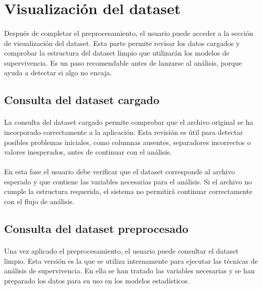 \section{Visualización del dataset}

\paragraph*{}Después de completar el preprocesamiento, el usuario puede acceder a la sección de visualización del dataset. Esta parte permite revisar los datos cargados y comprobar la estructura del dataset limpio que utilizarán los modelos de supervivencia. Es un paso recomendable antes de lanzarse al análisis, porque ayuda a detectar si algo no encaja.

\subsection{Consulta del dataset cargado}

\paragraph*{}La consulta del dataset cargado permite comprobar que el archivo original se ha incorporado correctamente a la aplicación. Esta revisión es útil para detectar posibles problemas iniciales, como columnas ausentes, separadores incorrectos o valores inesperados, antes de continuar con el análisis.

\paragraph*{}En esta fase el usuario debe verificar que el dataset corresponde al archivo esperado y que contiene las variables necesarias para el análisis. Si el archivo no cumple la estructura requerida, el sistema no permitirá continuar correctamente con el flujo de análisis.

\subsection{Consulta del dataset preprocesado}

\paragraph*{}Una vez aplicado el preprocesamiento, el usuario puede consultar el dataset limpio. Esta versión es la que se utiliza internamente para ejecutar las técnicas de análisis de supervivencia. En ella se han tratado las variables necesarias y se han preparado los datos para su uso en los modelos estadísticos.

